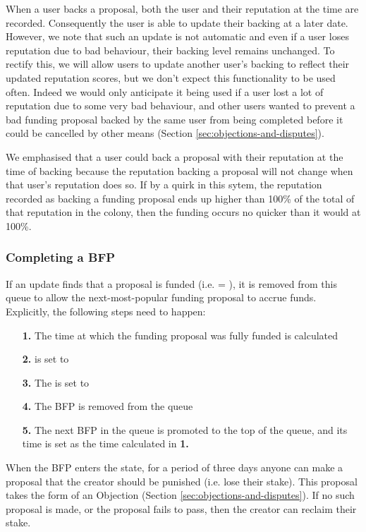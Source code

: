When a user backs a proposal, both the user and their reputation at the time are recorded. Consequently the user is able to update their backing at a later date. However, we note that such an update is not automatic and even if a user loses reputation due to bad behaviour, their backing level remains unchanged. To rectify this, we will allow users to update another user's backing to reflect their updated reputation scores, but we don't expect this functionality to be used often. Indeed we would only anticipate it being used if a user lost a lot of reputation due to some very bad behaviour, and other users wanted to prevent a bad funding proposal backed by the same user from being completed before it could be cancelled by other means (Section \ref{sec:objections-and-disputes}).

We emphasised that a user could back a proposal with their reputation at the time of backing because the reputation backing a proposal will not change when that user's reputation does so. If by a quirk in this sytem, the reputation recorded as backing a funding proposal ends up higher than 100\% of the total of that reputation in the colony, then the funding occurs no quicker than it would at 100\%.

\subsubsection*{Completing a BFP}
If an update finds that a proposal is funded (i.e.  = ), it is removed from this queue to allow the next-most-popular funding proposal to accrue funds. Explicitly, the following steps need to happen:
\begin{itemize}
 \item[\textbf{1.}] The time at which the funding proposal was fully funded is calculated%
 \item[\textbf{2.}]  is set to 
 \item[\textbf{3.}] The  is set to 
 \item[\textbf{4.}] The BFP is removed from the queue
 \item[\textbf{5.}] The next BFP in the queue is promoted to the top of the queue, and its  time is set as the time calculated in \textbf{1.}
\end{itemize}


When the BFP enters the  state, for a period of three days anyone can make a proposal that the creator should be punished (i.e. lose their stake). This proposal takes the form of an Objection (Section \ref{sec:objections-and-disputes}). If no such proposal is made, or the proposal fails to pass, then the creator can reclaim their stake.

